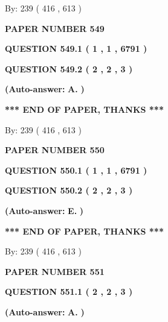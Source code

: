 \documentclass[12pt]{article}
\begin{document}
   
\hspace{1.0in} By: 
 239 ( 416 ,  613 )
   
   
   
   
\newpage 
\setcounter{page}{ 
   549001 } 
   
   
 {\textbf{ \Large{ PAPER NUMBER  549  }}}
   
   
   
   
  
  
{\textbf{\large{QUESTION
549.1 
 ( 1 , 1 , 6791 )
}}}
  
  
{\textbf{\large{QUESTION
549.2 
 ( 2 , 2 , 3 )
}}}
 
 
{\textbf{(Auto-answer:}}
{\textbf{\large{
A.}}}
{\textbf{)}}
 
 
   
   
   
   
\vspace{1.0in} 
{\textbf{\large{ *** END OF PAPER, THANKS *** }}} 
   
   
\hspace{1.0in} By: 
 239 ( 416 ,  613 )
   
   
   
   
\newpage 
\setcounter{page}{ 
   550001 } 
   
   
 {\textbf{ \Large{ PAPER NUMBER  550  }}}
   
   
   
   
  
  
{\textbf{\large{QUESTION
550.1 
 ( 1 , 1 , 6791 )
}}}
  
  
{\textbf{\large{QUESTION
550.2 
 ( 2 , 2 , 3 )
}}}
 
 
{\textbf{(Auto-answer:}}
{\textbf{\large{
E.}}}
{\textbf{)}}
 
 
   
   
   
   
\vspace{1.0in} 
{\textbf{\large{ *** END OF PAPER, THANKS *** }}} 
   
   
\hspace{1.0in} By: 
 239 ( 416 ,  613 )
   
   
   
   
\newpage 
\setcounter{page}{ 
   551001 } 
   
   
 {\textbf{ \Large{ PAPER NUMBER  551  }}}
   
   
   
   
  
  
{\textbf{\large{QUESTION
551.1 
 ( 2 , 2 , 3 )
}}}
 
 
{\textbf{(Auto-answer:}}
{\textbf{\large{
A.}}}
{\textbf{)}}
 
\end{document}
